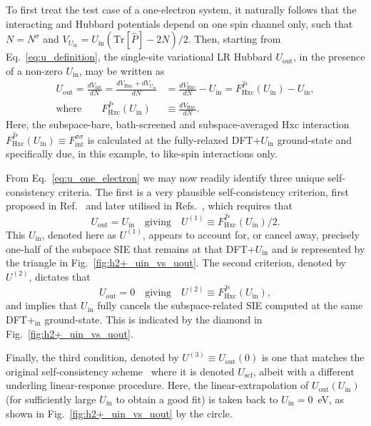 {To first treat the test case of a 
one-electron system, 
it naturally follows that  
the interacting and Hubbard potentials 
depend on one spin channel only, 
such that $N=N^\sigma$ and 
$V_{U_\textrm{in}}=U_\textrm{in}(\textrm{Tr}[\hat{P}]-2N)/2$.}
%
Then, starting from Eq.~\eqref{eq:u_definition},
the single-site variational LR Hubbard $U_\textrm{out}$, 
in the presence of a non-zero  $U_\textrm{in}$, 
may be written as
% 
\begin{align}
U_\textrm{out}=\frac{d V_\textrm{int}}{d N} 
=\frac{d V_\textrm{Hxc} +dV_{U_\textrm{in}}}{d N}
&=\frac{d V_\textrm{Hxc} }{d N}-U_\textrm{in}
=F^{\hat{P}}_\textrm{Hxc}(U_\textrm{in})-U_\textrm{in},\nonumber \\[1em]
\mbox{where}\qquad 
F^{\hat{P}}_\textrm{Hxc} (U_\textrm{in}) &\equiv \frac{dV_\textrm{Hxc}}{d N}.
\label{eq:u_one_electron}
\end{align}
%
Here, the subspace-bare, bath-screened 
and subspace-averaged Hxc interaction \break 
$F^{\hat{P}}_\textrm{Hxc} (U_\textrm{in}) \equiv 
F^{\sigma\sigma}_\textrm{int}$ 
is calculated at the fully-relaxed 
DFT+$U_\textrm{in}$ ground-state 
and specifically due, in this example, 
to like-spin interactions only.
  

From Eq.~\ref{eq:u_one_electron} 
we may now readily identify 
three unique self-consistency criteria.
%
The first is a very plausible self-consistency criterion, 
first proposed in Ref.~\cite{0953-8984-22-5-055602} 
and later utilised in Refs.~\cite{PhysRevB.84.115108,PhysRevB.93.085135}, 
which requires that
%
\begin{equation}
 U_\textrm{out}=U_\textrm{in}
\quad\mbox{giving}\quad 
U^{(1)}\equiv F^{\hat{P}}_\textrm{Hxc}(U_\textrm{in})/2.
\end{equation}
%
This $U_\textrm{in}$, denoted here as $U^{(1)}$, 
appears to account for, or cancel away, 
precisely one-half of the subspace SIE 
that remains at that DFT+$U_\textrm{in}$ 
and is represented by the triangle 
in Fig.~\ref{fig:h2+_uin_vs_uout}.
%
The second criterion, 
denoted by $U^{(2)}$, dictates that    
%
\begin{equation}
 U_\textrm{out}=0
\quad\mbox{giving}\quad 
U^{(2)}\equiv F^{\hat{P}}_\textrm{Hxc}(U_\textrm{in}),
\end{equation}
%
and implies that $U_\textrm{in}$  
fully cancels the subspace-related SIE 
computed at the same DFT+$_\textrm{in}$ ground-state.
%
This is indicated by the diamond  
in Fig.~\ref{fig:h2+_uin_vs_uout}.

Finally, the third condition, denoted by $U^{(3)}\equiv U_\textrm{out} ( 0 )$ 
is one that matches the original 
self-consistency scheme~\cite{PhysRevLett.97.103001}
where it is denoted $U_\textrm{scf}$, 
albeit with a different underling linear-response procedure.
%
Here, the linear-extrapolation of  
$U_\textrm{out} ( U_\textrm{in} )$ 
(for sufficiently large $U_\textrm{in}$
to obtain a good fit)
is taken back to $U_\textrm{in} = 0$~eV, 
as shown in Fig.~\ref{fig:h2+_uin_vs_uout} 
by the circle.


